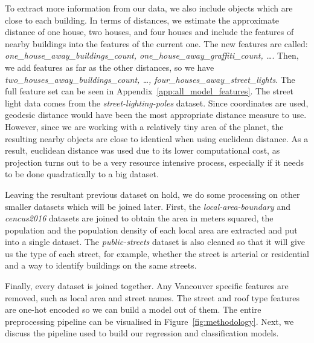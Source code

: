 To extract more information from our data, we also include objects which are close to each building. In terms of distances, we estimate the approximate distance of one house, two houses, and four houses and include the features of nearby buildings into the features of the current one. The new features are called: \textit{one\_house\_away\_buildings\_count, one\_house\_away\_graffiti\_count, \ldots}. Then, we add features as far as the other distances, so we have \textit{two\_houses\_away\_buildings\_count, \ldots, four\_houses\_away\_street\_lights}. The full feature set can be seen in Appendix~\ref{app:all_model_features}. The street light data comes from the \textit{street-lighting-poles} dataset. Since coordinates are used, geodesic distance would have been the most appropriate distance measure to use. However, since we are working with a relatively tiny area of the planet, the resulting nearby objects are close to identical when using euclidean distance. As a result, euclidean distance was used due to its lower computational cost, as projection turns out to be a very resource intensive process, especially if it needs to be done quadratically to a big dataset.

Leaving the resultant previous dataset on hold, we do some processing on other smaller datasets which will be joined later. First, the \textit{local-area-boundary} and \textit{cencus2016} datasets are joined to obtain the area in meters squared, the population and the population density of each local area are extracted and put into a single dataset. The \textit{public-streets} dataset is also cleaned so that it will give us the type of each street, for example, whether the street is arterial or residential and a way to identify buildings on the same streets.

Finally, every dataset is joined together. Any Vancouver specific features are removed, such as local area and street names. The street and roof type features are one-hot encoded so we can build a model out of them. The entire preprocessing pipeline can be visualised in Figure~\ref{fig:methodology}. Next, we discuss the pipeline used to build our regression and classification models.


